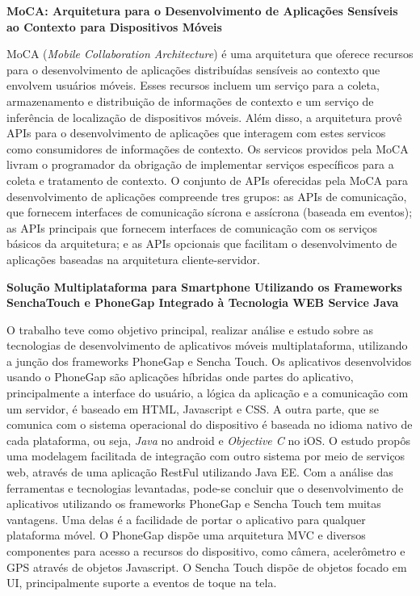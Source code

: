 \textbf{MoCA: Arquitetura para o Desenvolvimento de Aplicações Sensíveis ao Contexto para Dispositivos Móveis}\par
MoCA (\textit{Mobile Collaboration Architecture}) é uma arquitetura que oferece recursos para o desenvolvimento de aplicações distribuídas sensíveis ao contexto que envolvem usuários móveis. Esses recursos incluem um serviço para a coleta, armazenamento e distribuição de informações de contexto e um serviço de inferência de localização de dispositivos móveis. Além disso, a arquitetura provê APIs para o desenvolvimento de aplicações que interagem com estes servicos como consumidores de informações de contexto. Os servicos providos pela MoCA livram o programador da obrigação de implementar serviços específicos para a coleta e tratamento de contexto. O conjunto de APIs oferecidas pela MoCA para desenvolvimento de aplicações compreende tres grupos: as APIs de comunicação, que fornecem interfaces de comunicação sícrona e assícrona (baseada em eventos); as APIs principais que fornecem interfaces de comunicação com os serviços básicos da arquitetura; e as APIs opcionais que facilitam o desenvolvimento de aplicações baseadas na arquitetura cliente-servidor.\par


\textbf{Solução Multiplataforma para Smartphone Utilizando os Frameworks SenchaTouch e PhoneGap Integrado à Tecnologia WEB Service Java}\par
O trabalho teve como objetivo principal, realizar análise e estudo sobre as tecnologias de desenvolvimento de aplicativos móveis multiplataforma, utilizando a junção dos frameworks PhoneGap e Sencha Touch. Os aplicativos desenvolvidos usando o PhoneGap são aplicações híbridas onde partes do aplicativo, principalmente a interface do usuário, a lógica da aplicação e a comunicação com um servidor, é baseado em HTML, Javascript e CSS. A outra parte, que se comunica com o sistema operacional do dispositivo é baseada no idioma nativo de cada plataforma, ou seja, \textit{Java} no android e \textit{Objective C} no iOS. O estudo propôs uma modelagem facilitada de integração com outro sistema por meio de serviços web, através de uma aplicação RestFul utilizando Java EE. Com a análise das ferramentas e tecnologias levantadas, pode-se concluir que o desenvolvimento de aplicativos utilizando os frameworks PhoneGap e Sencha Touch tem muitas vantagens. Uma delas é a facilidade de portar o aplicativo para qualquer plataforma móvel. O  PhoneGap dispõe uma arquitetura MVC e diversos componentes para acesso a recursos do dispositivo, como câmera, acelerômetro e GPS através de objetos Javascript. O Sencha Touch dispõe de objetos focado em UI, principalmente suporte a eventos de toque na tela.\par


